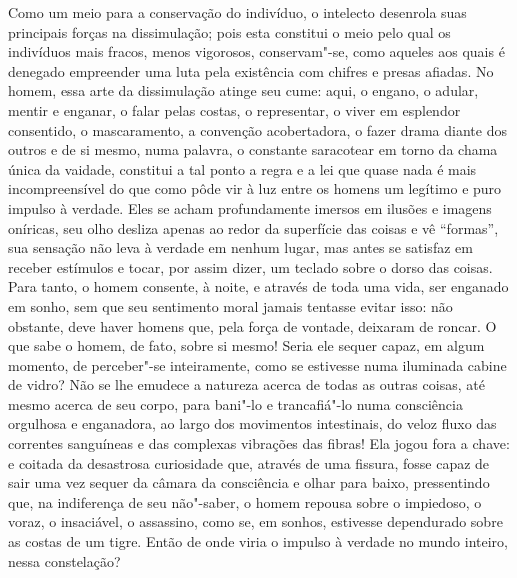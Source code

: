 Como um meio para a conservação do indivíduo, o intelecto desenrola suas
principais forças na dissimulação; pois esta constitui o meio pelo qual
os indivíduos mais fracos, menos vigorosos, conservam"-se, como
aqueles aos quais é denegado empreender uma luta pela existência com
chifres e presas afiadas. No homem, essa arte da dissimulação atinge
seu cume: aqui, o engano, o adular, mentir e enganar, o falar pelas
costas, o representar, o viver em esplendor consentido, o mascaramento,
a convenção acobertadora, o fazer drama diante dos outros e de si
mesmo, numa palavra, o constante saracotear em torno da chama única da
vaidade, constitui a tal ponto a regra e a lei que quase nada é mais
incompreensível do que como pôde vir à luz entre os homens um legítimo
e puro impulso à verdade. Eles se acham profundamente imersos em
ilusões e imagens oníricas, seu olho desliza apenas ao redor da
superfície das coisas e vê “formas”, sua sensação não leva à verdade em
nenhum lugar, mas antes se satisfaz em receber estímulos e tocar, por
assim dizer, um teclado sobre o dorso das coisas. Para tanto, o homem
consente, à noite, e através de toda uma vida, ser enganado em sonho,
sem que seu sentimento moral jamais tentasse evitar isso: não obstante,
deve haver homens que, pela força de vontade, deixaram de roncar. O que
sabe o homem, de fato, sobre si mesmo! Seria ele sequer capaz, em algum
momento, de perceber"-se inteiramente, como se estivesse numa
iluminada cabine de vidro? Não se lhe emudece a natureza acerca de
todas as outras coisas, até mesmo acerca de seu corpo, para bani"-lo e
trancafiá"-lo numa consciência orgulhosa e enganadora, ao largo dos
movimentos intestinais, do veloz fluxo das correntes sanguíneas e das
complexas vibrações das fibras! Ela jogou fora a chave: e coitada da
desastrosa curiosidade que, através de uma fissura, fosse capaz de sair
uma vez sequer da câmara da consciência e olhar para baixo,
pressentindo que, na indiferença de seu não"-saber, o homem repousa
sobre o impiedoso, o voraz, o insaciável, o assassino, como se, em
sonhos, estivesse dependurado sobre as costas de um tigre. Então de
onde viria o impulso à verdade no mundo inteiro, nessa constelação?

